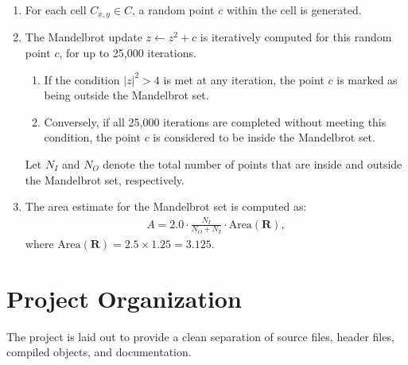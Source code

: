 \documentclass{article}
\begin{document}
\begin{enumerate}
    \item For each cell $C_{x, y} \in C$, a random point $c$ within the cell is generated.
    \item The Mandelbrot update $z \leftarrow z^2 + c$ is iteratively computed for this random point $c$, for up to 25,000 iterations.
    \begin{enumerate}
        \item If the condition $\lvert z \rvert^2 > 4$ is met at any iteration, the point $c$ is marked as being outside the Mandelbrot set.
        \item Conversely, if all 25,000 iterations are completed without meeting this condition, the point $c$ is considered to be inside the Mandelbrot set.
    \end{enumerate}
    
    Let $N_I$ and $N_O$ denote the total number of points that are inside and outside the Mandelbrot set, respectively.
    \item The area estimate for the Mandelbrot set is computed as:
    \begin{align*}
        A = 2.0 \cdot \frac{N_I}{N_O + N_I} \cdot \text{Area}(\textbf{R}),
    \end{align*}
    where $\text{Area}(\textbf{R}) = 2.5 \times 1.25 = 3.125$.
\end{enumerate}

\section{Project Organization}

The project is laid out to provide a clean separation of source files, header files, compiled objects, and documentation. 
\end{document}
